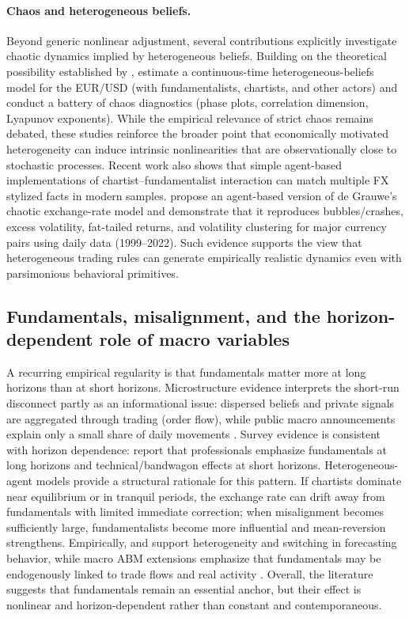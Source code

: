 \documentclass[a4paper,10pt,final]{article}    %
\begin{document}
\paragraph{Chaos and heterogeneous beliefs.}
Beyond generic nonlinear adjustment, several contributions explicitly investigate chaotic dynamics implied by heterogeneous beliefs. Building on the theoretical possibility established by \citet{de1993chaotic}, \citet{federici2012euro} estimate a continuous-time heterogeneous-beliefs model for the EUR/USD (with fundamentalists, chartists, and other actors) and conduct a battery of chaos diagnostics (phase plots, correlation dimension, Lyapunov exponents). While the empirical relevance of strict chaos remains debated, these studies reinforce the broader point that economically motivated heterogeneity can induce intrinsic nonlinearities that are observationally close to stochastic processes.
Recent work also shows that simple agent-based implementations of chartist--fundamentalist interaction can match multiple FX stylized facts in modern samples. \citet{mignot2025explaining} propose an agent-based version of de Grauwe’s chaotic exchange-rate model and demonstrate that it reproduces bubbles/crashes, excess volatility, fat-tailed returns, and volatility clustering for major currency pairs using daily data (1999--2022). Such evidence supports the view that heterogeneous trading rules can generate empirically realistic dynamics even with parsimonious behavioral primitives.

\subsection{Fundamentals, misalignment, and the horizon-dependent role of macro variables}
\label{subsec:fundamentals}

A recurring empirical regularity is that fundamentals matter more at long horizons than at short horizons. Microstructure evidence interprets the short-run disconnect partly as an informational issue: dispersed beliefs and private signals are aggregated through trading (order flow), while public macro announcements explain only a small share of daily movements \citep{Lyons2001,EvansLyons2002,EvansLyons2008}. Survey evidence is consistent with horizon dependence: \citet{CheungChinn2001} report that professionals emphasize fundamentals at long horizons and technical/bandwagon effects at short horizons.
Heterogeneous-agent models provide a structural rationale for this pattern. If chartists dominate near equilibrium or in tranquil periods, the exchange rate can drift away from fundamentals with limited immediate correction; when misalignment becomes sufficiently large, fundamentalists become more influential and mean-reversion strengthens. Empirically, \citet{manzan2007heterogeneous} and \citet{goldbaum2014empirical} support heterogeneity and switching in forecasting behavior, while macro ABM extensions emphasize that fundamentals may be endogenously linked to trade flows and real activity \citep{gori2018dynamic,delli2024complex}. Overall, the literature suggests that fundamentals remain an essential anchor, but their effect is nonlinear and horizon-dependent rather than constant and contemporaneous.
\end{document}
